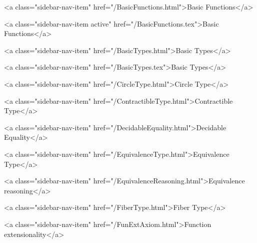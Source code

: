           <a class="sidebar-nav-item" href="/BasicFunctions.html">Basic Functions</a>
        
      
    
      
        
          <a class="sidebar-nav-item active" href="/BasicFunctions.tex">Basic Functions</a>
        
      
    
      
        
          <a class="sidebar-nav-item" href="/BasicTypes.html">Basic Types</a>
        
      
    
      
        
          <a class="sidebar-nav-item" href="/BasicTypes.tex">Basic Types</a>
        
      
    
      
        
          <a class="sidebar-nav-item" href="/CircleType.html">Circle Type</a>
        
      
    
      
        
          <a class="sidebar-nav-item" href="/ContractibleType.html">Contractible Type</a>
        
      
    
      
        
          <a class="sidebar-nav-item" href="/DecidableEquality.html">Decidable Equality</a>
        
      
    
      
        
          <a class="sidebar-nav-item" href="/EquivalenceType.html">Equivalence Type</a>
        
      
    
      
        
          <a class="sidebar-nav-item" href="/EquivalenceReasoning.html">Equivalence reasoning</a>
        
      
    
      
        
          <a class="sidebar-nav-item" href="/FiberType.html">Fiber Type</a>
        
      
    
      
        
          <a class="sidebar-nav-item" href="/FunExtAxiom.html">Function extensionality</a>
        
      
    
